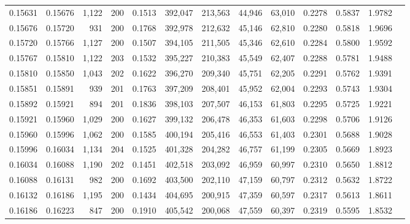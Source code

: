 \begin{tabular}{rrrrrrrrrrrrr}
0.15631 & 0.15676 & 1,122 & 200 &                                     0.1513 & 392,047 & 213,563 &  44,946 &  63,010 & 0.2278 & 0.5837 & 1.9782 \\
0.15676 & 0.15720 &   931 & 200 &                                     0.1768 & 392,978 & 212,632 &  45,146 &  62,810 & 0.2280 & 0.5818 & 1.9696 \\
0.15720 & 0.15766 & 1,127 & 200 &                                     0.1507 & 394,105 & 211,505 &  45,346 &  62,610 & 0.2284 & 0.5800 & 1.9592 \\
0.15767 & 0.15810 & 1,122 & 203 &                                     0.1532 & 395,227 & 210,383 &  45,549 &  62,407 & 0.2288 & 0.5781 & 1.9488 \\
0.15810 & 0.15850 & 1,043 & 202 &                                     0.1622 & 396,270 & 209,340 &  45,751 &  62,205 & 0.2291 & 0.5762 & 1.9391 \\
0.15851 & 0.15891 &   939 & 201 &                                     0.1763 & 397,209 & 208,401 &  45,952 &  62,004 & 0.2293 & 0.5743 & 1.9304 \\
0.15892 & 0.15921 &   894 & 201 &                                     0.1836 & 398,103 & 207,507 &  46,153 &  61,803 & 0.2295 & 0.5725 & 1.9221 \\
0.15921 & 0.15960 & 1,029 & 200 &                                     0.1627 & 399,132 & 206,478 &  46,353 &  61,603 & 0.2298 & 0.5706 & 1.9126 \\
0.15960 & 0.15996 & 1,062 & 200 &                                     0.1585 & 400,194 & 205,416 &  46,553 &  61,403 & 0.2301 & 0.5688 & 1.9028 \\
0.15996 & 0.16034 & 1,134 & 204 &                                     0.1525 & 401,328 & 204,282 &  46,757 &  61,199 & 0.2305 & 0.5669 & 1.8923 \\
0.16034 & 0.16088 & 1,190 & 202 &                                     0.1451 & 402,518 & 203,092 &  46,959 &  60,997 & 0.2310 & 0.5650 & 1.8812 \\
0.16088 & 0.16131 &   982 & 200 &                                     0.1692 & 403,500 & 202,110 &  47,159 &  60,797 & 0.2312 & 0.5632 & 1.8722 \\
0.16132 & 0.16186 & 1,195 & 200 &                                     0.1434 & 404,695 & 200,915 &  47,359 &  60,597 & 0.2317 & 0.5613 & 1.8611 \\
0.16186 & 0.16223 &   847 & 200 &                                     0.1910 & 405,542 & 200,068 &  47,559 &  60,397 & 0.2319 & 0.5595 & 1.8532 \\

\end{tabular}
